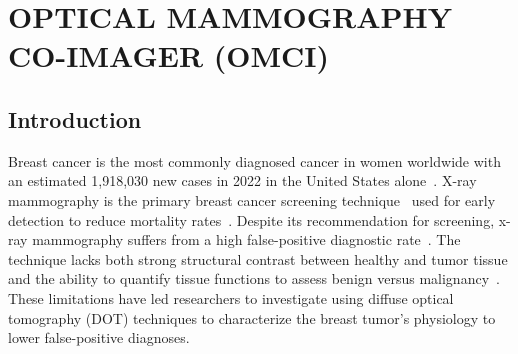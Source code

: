 
\chapter{OPTICAL MAMMOGRAPHY CO-IMAGER (OMCI)} %
\label{chap:omci}


\section{Introduction} %
\label{chap:omci:introduction}
Breast cancer is the most commonly diagnosed cancer in women worldwide with an estimated 1,918,030 new cases in 2022 in the United States alone~\cite{Siegel2022}. X-ray mammography is the primary breast cancer screening technique~\cite{Secretan2015} used for early detection to reduce mortality rates~\cite{Tabar2003}. Despite its recommendation for screening, x-ray mammography suffers from a high false-positive diagnostic rate~\cite{Tabar2003, Elmore1998}. The technique lacks both strong structural contrast between healthy and tumor tissue and the ability to quantify tissue functions to assess benign versus malignancy~\cite{Leff2008}. These limitations have led researchers to investigate using diffuse optical tomography (DOT) techniques to characterize the breast tumor's physiology to lower false-positive diagnoses. 

